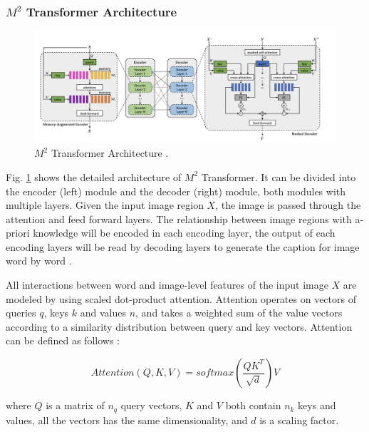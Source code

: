 \documentclass[
]{krantz}
\begin{document}
\hypertarget{m2-transformer-architecture}{%
\subsubsection{\texorpdfstring{\(M^2\) Transformer Architecture}{M\^{}2 Transformer Architecture}}\label{m2-transformer-architecture}}

\begin{figure}

{\centering \includegraphics[width=1\linewidth]{figures/02-01/2.1 m2} 

}

\caption{\(M^2\) Transformer Architecture \citep{cornia2020m2}.}\label{fig:m2arc2}
\end{figure}



Fig. \ref{fig:m2arc2} shows the detailed architecture of \(M^2\) Transformer. It can be divided into the encoder (left) module and the decoder (right) module, both modules with multiple layers. Given the input image region \(X\), the image is passed through the attention and feed forward layers. The relationship between image regions with a-priori knowledge will be encoded in each encoding layer, the output of each encoding layers will be read by decoding layers to generate the caption for image word by word \citep{cornia2020m2}.

All interactions between word and image-level features of the input image \(X\) are modeled by using scaled dot-product attention. Attention operates on vectors of queries \(q\), keys \(k\) and values \(n\), and takes a weighted sum of the value vectors according to a similarity distribution between query and key vectors.
Attention can be defined as follows \citep{cornia2020m2}:

\begin{equation}
Attention(Q, K, V) = softmax(\frac{QK^T}{\sqrt{d}}) V
\label{eq:binom}
\end{equation}

where \(Q\) is a matrix of \(n_q\) query vectors, \(K\) and \(V\) both contain \(n_k\) keys and values, all the vectors has the same dimensionality, and \(d\) is a scaling factor.
\end{document}
